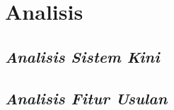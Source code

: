 \chapter{Analisis}
\label{chap:analisis}

\section{\textit{Analisis Sistem Kini}}
\label{sec:analisiskini}

\section{\textit{Analisis Fitur Usulan}}
\label{sec:analisiskini}